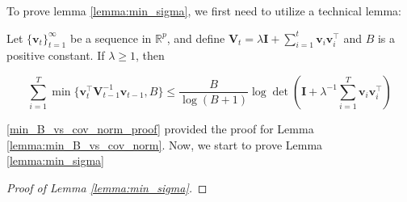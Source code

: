 To prove lemma \ref{lemma:min_sigma}, we first need to utilize a technical lemma:
\begin{sublemma}
\label{lemma:min_B_vs_cov_norm}
Let $\{ \mathbf{v}_t\}_{t=1}^\infty$ be a sequence in $\mathbb{R}^p$, and
define $\mathbf{V}_t = \lambda \mathbf{I} + \sum^t_{i=1} \mathbf{v}_i\mathbf{v}_i^\top$ and $B$ is a positive constant. If $\lambda \geq 1$, then

\[ 
\sum_{i=1}^T \min \{ \mathbf{v}_t^\top \mathbf{V}_{t-1}^{-1}\mathbf{v}_{t-1}, B\} \leq \frac{B}{\log(B+1)} \log \det(\mathbf{I} + \lambda^{-1}\sum_{i=1}^T \mathbf{v}_i\mathbf{v}_i^\top)
\]
\end{sublemma}
\ref{min_B_vs_cov_norm_proof} provided the proof for Lemma \ref{lemma:min_B_vs_cov_norm}. Now, we start to prove Lemma \ref{lemma:min_sigma}
\begin{proof}[Proof of Lemma \ref{lemma:min_sigma}]


\end{proof}
